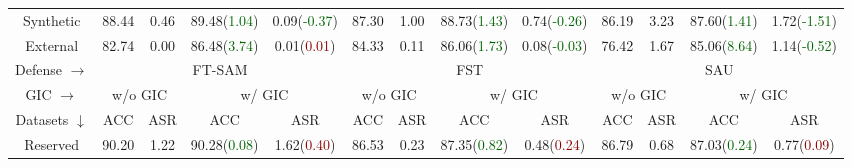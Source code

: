 \begin{table*}[ht]
{\begin{tabular}{c|cc|cc|cc|cc|cc|cc}
    Synthetic  & 88.44                   & 0.46                    & 89.48(\textcolor{darkgreen}{1.04}) & 0.09(\textcolor{darkgreen}{-0.37}) & 87.30                    & 1.00                       & 88.73(\textcolor{darkgreen}{1.43}) & 0.74(\textcolor{darkgreen}{-0.26}) & 86.19                   & 3.23                    & 87.60(\textcolor{darkgreen}{1.41}) & 1.72(\textcolor{darkgreen}{-1.51}) \\ 
    External   & 82.74                   & {0.00}   & 86.48(\textcolor{darkgreen}{3.74}) & 0.01(\textcolor{darkred}{0.01})    & 84.33                   & 0.11                    & 86.06(\textcolor{darkgreen}{1.73}) & 0.08(\textcolor{darkgreen}{-0.03}) & 76.42                   & 1.67                    & 85.06(\textcolor{darkgreen}{8.64}) & 1.14(\textcolor{darkgreen}{-0.52}) \\ \midrule \midrule
          Defense $\rightarrow$     & \multicolumn{4}{c|}{FT-SAM}                                                                                                                                & \multicolumn{4}{c|}{FST}                                                                                                                                   & \multicolumn{4}{c}{SAU}                                                                                                                                   \\ \midrule
        GIC $\rightarrow$       & \multicolumn{2}{c|}{w/o GIC}                       & \multicolumn{2}{c|}{w/ GIC}                                                                            & \multicolumn{2}{c|}{w/o GIC}                       & \multicolumn{2}{c|}{w/ GIC}                                                                            & \multicolumn{2}{c|}{w/o GIC}                       & \multicolumn{2}{c}{w/ GIC}                                                                            \\ \midrule
        Datasets $\downarrow$       & {ACC} & {ASR} & ACC                                               & ASR                                               & {ACC} & {ASR} & ACC                                               & ASR                                               & {ACC} & {ASR} & ACC                                               & ASR                                               \\ \midrule
    Reserved   & 90.20                    & 1.22                    & 90.28(\textcolor{darkgreen}{0.08}) & 1.62(\textcolor{darkred}{0.40})    & 86.53                   & 0.23                    & 87.35(\textcolor{darkgreen}{0.82}) & 0.48(\textcolor{darkred}{0.24})    & 86.79                   & 0.68                    & 87.03(\textcolor{darkgreen}{0.24}) & 0.77(\textcolor{darkred}{0.09})    \\

\end{tabular}}
\end{table*}
